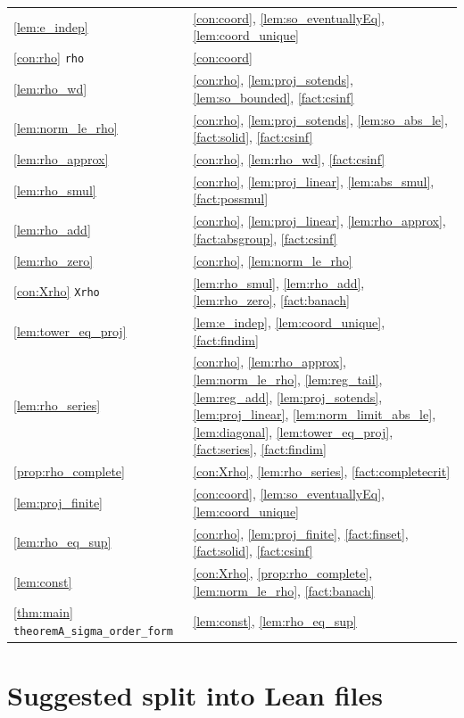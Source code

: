 \documentclass[11pt]{article}
\theoremstyle{definition}
\theoremstyle{plain}
\theoremstyle{remark}
\begin{document}
\begin{center}
\begin{tabular}{ll}
\ref{lem:e_indep} & \ref{con:coord}, \ref{lem:so_eventuallyEq}, \ref{lem:coord_unique} \\
\ref{con:rho} \texttt{rho} & \ref{con:coord} \\
\ref{lem:rho_wd} & \ref{con:rho}, \ref{lem:proj_sotends}, \ref{lem:so_bounded}, \ref{fact:csinf} \\
\ref{lem:norm_le_rho} & \ref{con:rho}, \ref{lem:proj_sotends}, \ref{lem:so_abs_le}, \ref{fact:solid}, \ref{fact:csinf} \\
\ref{lem:rho_approx} & \ref{con:rho}, \ref{lem:rho_wd}, \ref{fact:csinf} \\
\ref{lem:rho_smul} & \ref{con:rho}, \ref{lem:proj_linear}, \ref{lem:abs_smul}, \ref{fact:possmul} \\
\ref{lem:rho_add} & \ref{con:rho}, \ref{lem:proj_linear}, \ref{lem:rho_approx}, \ref{fact:absgroup}, \ref{fact:csinf} \\
\ref{lem:rho_zero} & \ref{con:rho}, \ref{lem:norm_le_rho} \\
\ref{con:Xrho} \texttt{Xrho} & \ref{lem:rho_smul}, \ref{lem:rho_add}, \ref{lem:rho_zero}, \ref{fact:banach} \\
\ref{lem:tower_eq_proj} & \ref{lem:e_indep}, \ref{lem:coord_unique}, \ref{fact:findim} \\
\ref{lem:rho_series} & \ref{con:rho}, \ref{lem:rho_approx}, \ref{lem:norm_le_rho}, \ref{lem:reg_tail}, \ref{lem:reg_add}, \ref{lem:proj_sotends}, \ref{lem:proj_linear}, \ref{lem:norm_limit_abs_le}, \ref{lem:diagonal}, \ref{lem:tower_eq_proj}, \ref{fact:series}, \ref{fact:findim} \\
\ref{prop:rho_complete} & \ref{con:Xrho}, \ref{lem:rho_series}, \ref{fact:completecrit} \\
\ref{lem:proj_finite} & \ref{con:coord}, \ref{lem:so_eventuallyEq}, \ref{lem:coord_unique} \\
\ref{lem:rho_eq_sup} & \ref{con:rho}, \ref{lem:proj_finite}, \ref{fact:finset}, \ref{fact:solid}, \ref{fact:csinf} \\
\ref{lem:const} & \ref{con:Xrho}, \ref{prop:rho_complete}, \ref{lem:norm_le_rho}, \ref{fact:banach} \\
\ref{thm:main} \texttt{theoremA\_sigma\_order\_form} & \ref{lem:const}, \ref{lem:rho_eq_sup} \\
\bottomrule
\end{tabular}
\end{center}

\section{Suggested split into Lean files}\label{sec:files}
\end{document}
